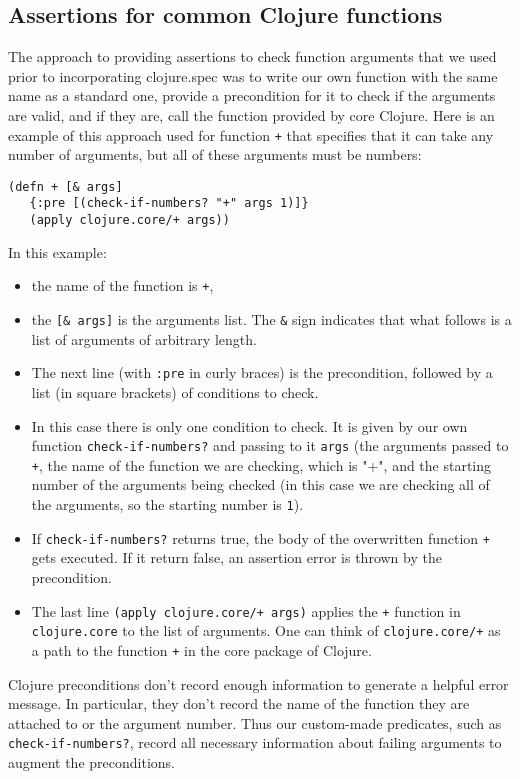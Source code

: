 \documentclass[12pt]{article}
\begin{document}
\subsection{Assertions for common Clojure functions}\label{sec:assert}
The approach to providing assertions to check function arguments that we used prior to 
incorporating clojure.spec was to write our own function with the same name as a standard one, 
provide a precondition for it to check if the arguments are valid, and if they are, call 
the function provided by core Clojure. Here is an example of this approach used for
function {\tt +} that specifies that it can take any number of arguments, but all
of these arguments must be numbers:
\begin{verbatim}
(defn + [& args]
   {:pre [(check-if-numbers? "+" args 1)]}
   (apply clojure.core/+ args))
\end{verbatim} 
In this example:
\begin{itemize}
\item the name of the function is {\tt +}, 
\item the {\tt [\& args]} is the arguments list. The {\tt \&} sign indicates that what follows is
a list of arguments of arbitrary length. 
\item The next line (with {\tt :pre} in curly braces) is the precondition, followed by a list
(in square brackets) of conditions to check. 
\item In this case there is only one condition to check. It is given by our own 
function {\tt check-if-numbers?} 
and passing to it {\tt args} (the arguments passed to {\tt +}, the name of the function we 
are checking, which is "+", and the starting number of the arguments being checked 
(in this case we are checking all of the arguments, so the starting number is {\tt 1}). 
\item  If {\tt check-if-numbers?}  returns true, the body of the overwritten function {\tt +} 
gets executed. If it return false, an assertion error is thrown by the precondition. 
\item The last line {\tt  (apply clojure.core/+ args)} applies the {\tt +} function in 
{\tt clojure.core} to the list of arguments. One can think of {\tt  clojure.core/+} as 
a path to the function {\tt +} in the core package of Clojure. 
\end{itemize}
Clojure preconditions don't record enough information to generate a helpful error message. 
In particular, they don't record the name of the function they are attached to or the argument 
number. Thus our custom-made predicates, such as  {\tt check-if-numbers?}, record all 
necessary information about failing arguments to augment the preconditions. 
\end{document}
